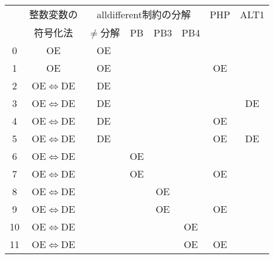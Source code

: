  \begin{tabular}[c] {c|c|c|c|c|c|c|c}
   & 整数変数の & \multicolumn{4}{|c|}{alldifferent制約の分解} & PHP & ALT1 \\\cline{3-6}
   & 符号化法   & $\neq$分解 & PB & PB3 & PB4 & & \\\hline\hline
  0     & OE                    & OE      &    &       &             &     &      \\
  1     & OE                    & OE      &    &       &             & OE  &      \\\hline
  2     & OE$\Leftrightarrow$DE & DE      &    &       &             &     &      \\
  3     & OE$\Leftrightarrow$DE & DE      &    &       &             &     & DE   \\
  4     & OE$\Leftrightarrow$DE & DE      &    &       &             & OE  &      \\
  5     & OE$\Leftrightarrow$DE & DE      &    &       &             & OE  & DE   \\
  6     & OE$\Leftrightarrow$DE &         & OE &       &             &     &      \\
  7     & OE$\Leftrightarrow$DE &         & OE &       &             & OE  &      \\
  8     & OE$\Leftrightarrow$DE &         &    & OE    &             &     &      \\
  9     & OE$\Leftrightarrow$DE &         &    & OE    &             & OE  &      \\
  10    & OE$\Leftrightarrow$DE &         &    &       & OE          &     &      \\
  11    & OE$\Leftrightarrow$DE &         &    &       & OE          & OE  &    
 \end{tabular}
